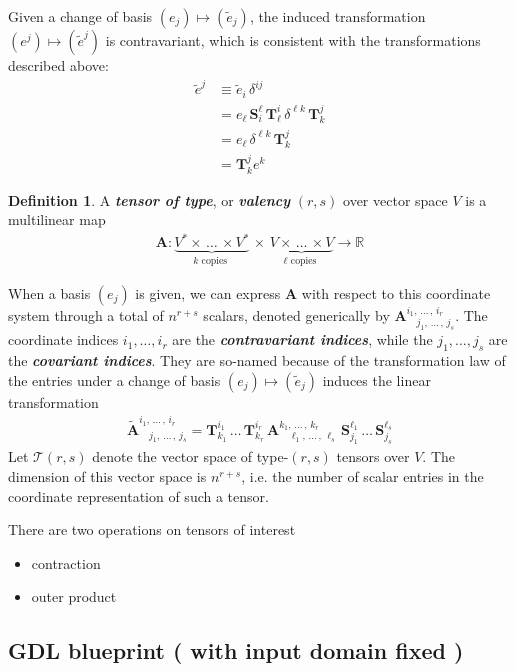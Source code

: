 \documentclass[12pt]{article}
\numberwithin{equation}{section}
\theoremstyle{definition}
\newtheorem{defn}[thm]{Definition}
\newcommand{		\R		}	{	\mathbb{R}				}
\newcommand{		\eq		}[1]	{	\begin{align*}#1\end{align*}	}%
\newcommand{		\B		}	{\textbf					} %
\newcommand{		\1		}	{	\bm{1}					}%
\begin{document}
Given a change of basis $(e_j) \mapsto (\tilde{e}_j)$, the induced transformation $(e^j) \mapsto (\tilde{e}^j)$ is contravariant, which is consistent with the transformations described above:
\eq{
\tilde{e}^j  &\equiv \tilde{e}_i \, \delta^{ij}  \\
&= e_\ell \, \bm{S}_i^\ell \, \bm{T}_\ell^i \, \delta^{\ell k} \, \bm{T}_k^j \\
&= e_\ell \,  \delta^{\ell k } \, \bm{T}_k^{j} \\
&=  \bm{T}_k^j e^k
}

\begin{defn} A \emph{\B{tensor of type}}, or \emph{\B{valency}} $(r,s)$ over vector space $V$ is a multilinear map 
\eq{
\bm{A} : \underbrace{V^* \times \, \dots \, \times V^*}_{ k \text{ copies }}  \,\times \, \underbrace{ V \times \, \dots \, \times V }_{ \ell \text{ copies }} \to \R
}
\end{defn}

When a basis $(e_j)$ is given, we can express $\bm{A}$ with respect to this coordinate system through a total of $n^{r+s}$ scalars, denoted generically by $\bm{A}_{ \quad j_1, \, \dots\, , \, j_s} ^ { i_1, \, \dots \, , \, i_r} $. The coordinate indices $i_1, \dots, i_r$ are the \emph{\B{contravariant indices}}, while the $j_1, \dots, j_s$ are the \emph{\B{covariant indices}}. They are so-named because of the transformation law of the entries under a change of basis $(e_j ) \mapsto (\tilde{e}_j)$ induces the linear transformation
\eq{
\tilde{\bm{A}} _{ \quad j_1, \, \dots\, , \, j_s} ^ { i_1, \, \dots \, , \, i_r} 
=
\bm{T}_{k_1}^{i_1} \, \dots \, \bm{T}_{k_r}^{i_r} \, \bm{A} _{ \quad \ell_1, \, \dots\, , \, \ell_s} ^ { k_1, \, \dots \, , \, k_r} \, \bm{S}_{j_1}^{\ell_1}  \, \dots \, \bm{S}_{j_s}^{\ell_s} 
}
Let $\mathcal{T}(r,s)$ denote the vector space of type-$(r,s)$ tensors over $V$. The dimension of this vector space is $n^{r+s}$, i.e. the number of scalar entries in the coordinate representation of such a tensor. 

There are two operations on tensors of interest
\begin{itemize}
\item contraction
\item outer product
\end{itemize}

\newpage
\subsection{GDL blueprint ( with input domain fixed ) } \label{subsec:GDLblue}
\end{document}
